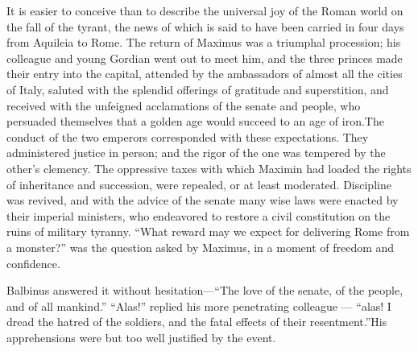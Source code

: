 
It is easier to conceive than to describe the universal joy of
the Roman world on the fall of the tyrant, the news of which is
said to have been carried in four days from Aquileia to Rome. The
return of Maximus was a triumphal procession; his colleague and
young Gordian went out to meet him, and the three princes made
their entry into the capital, attended by the ambassadors of
almost all the cities of Italy, saluted with the splendid
offerings of gratitude and superstition, and received with the
unfeigned acclamations of the senate and people, who persuaded
themselves that a golden age would succeed to an age of iron.\footnotemark[38]
The conduct of the two emperors corresponded with these
expectations. They administered justice in person; and the rigor
of the one was tempered by the other’s clemency. The oppressive
taxes with which Maximin had loaded the rights of inheritance and
succession, were repealed, or at least moderated. Discipline was
revived, and with the advice of the senate many wise laws were
enacted by their imperial ministers, who endeavored to restore a
civil constitution on the ruins of military tyranny. “What reward
may we expect for delivering Rome from a monster?” was the
question asked by Maximus, in a moment of freedom and confidence.

Balbinus answered it without hesitation—“The love of the senate,
of the people, and of all mankind.” “Alas!” replied his more
penetrating colleague — “alas! I dread the hatred of the soldiers,
and the fatal effects of their resentment.”\footnotemark[39] His apprehensions
were but too well justified by the event.



